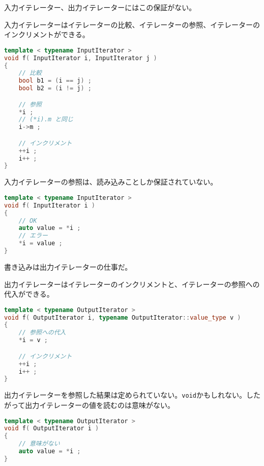 入力イテレーター、出力イテレーターにはこの保証がない。


入力イテレーターはイテレーターの比較、イテレーターの参照、イテレーターのインクリメントができる。

\begin{lstlisting}[language={C++}]
template < typename InputIterator >
void f( InputIterator i, InputIterator j )
{
    // 比較
    bool b1 = (i == j) ;
    bool b2 = (i != j) ;

    // 参照
    *i ;
    // (*i).m と同じ
    i->m ;

    // インクリメント
    ++i ;
    i++ ;
}
\end{lstlisting}

入力イテレーターの参照は、読み込みことしか保証されていない。

\begin{lstlisting}[language={C++}]
template < typename InputIterator >
void f( InputIterator i )
{
    // OK
    auto value = *i ;
    // エラー
    *i = value ;
}
\end{lstlisting}

書き込みは出力イテレーターの仕事だ。


出力イテレーターはイテレーターのインクリメントと、イテレーターの参照への代入ができる。

\begin{lstlisting}[language={C++}]
template < typename OutputIterator >
void f( OutputIterator i, typename OutputIterator::value_type v )
{
    // 参照への代入
    *i = v ;

    // インクリメント
    ++i ;
    i++ ;
}
\end{lstlisting}

出力イテレーターを参照した結果は定められていない。\texttt{void}かもしれない。したがって出力イテレーターの値を読むのは意味がない。

\begin{lstlisting}[language={C++}]
template < typename OutputIterator >
void f( OutputIterator i )
{
    // 意味がない
    auto value = *i ;
}
\end{lstlisting}


